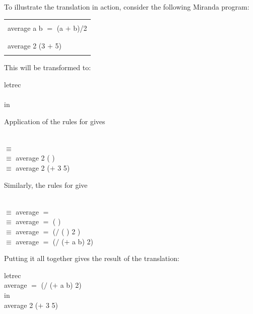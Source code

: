 To illustrate the translation in action, consider the following Miranda program:
\begin{mlcoded}
    \begin{center}
        \setlength{\extrarowheight}{0pt}
        \renewcommand{\arraystretch}{.6}

        \begin{tabular}{|l|}
            \hline\\
            average a b $=$ (a $+$ b)/2\\
            \\
            \hdashline \\
            average 2 (3 $+$ 5)\\
            \\
            \hline
        \end{tabular}

    \end{center}
\end{mlcoded}
This will be transformed to:
\begin{mlcoded}
    letrec\\
    \phantom{ww}\\
    in\\
    \phantom{ww}
\end{mlcoded}
Application of the rules for  gives
\begin{mlcoded}
    \\
    $\equiv$   \\
    $\equiv$ average 2 (  )\\
    $\equiv$ average 2 ($+$ 3 5)
\end{mlcoded}
Similarly, the rules for  give
\begin{mlcoded}
    \\
    $\equiv$ average $=$ \\
    $\equiv$ average $=$ (  )\\
    $\equiv$ average $=$ ($/$ (  ) 2 )\\
    $\equiv$ average $=$ ($/$ ($+$ a b) 2)
\end{mlcoded}
Putting it all together gives the result of the translation:
\begin{mlcoded}
    letrec\\
    \phantom{ww}average $=$ ($/$ ($+$ a b) 2)\\
    in\\
    \phantom{ww}average 2 ($+$ 3 5)
\end{mlcoded}


